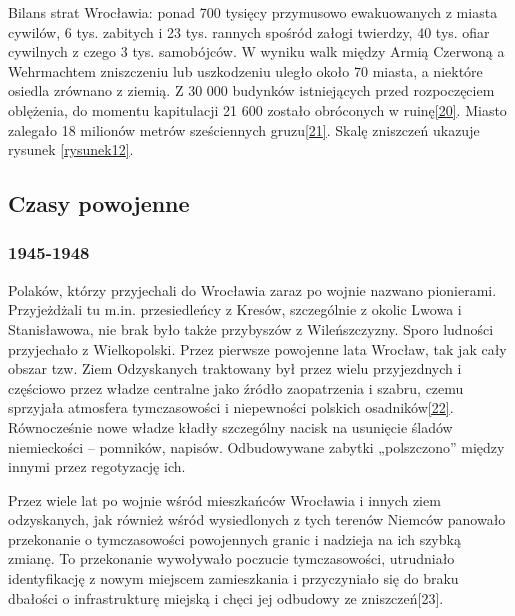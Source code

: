 \documentclass{article}
\begin{document}
\vspace{5pt}

\noindent Bilans strat Wrocławia: ponad 700 tysięcy przymusowo ewakuowanych z miasta cywilów, 6 tys. zabitych i 23 tys. rannych spośród załogi twierdzy, 40 tys. ofiar cywilnych z czego 3 tys. samobójców. W wyniku walk między Armią Czerwoną a Wehrmachtem zniszczeniu lub uszkodzeniu uległo około 70 miasta, a niektóre osiedla zrównano z ziemią. Z 30 000 budynków istniejących przed rozpoczęciem oblężenia, do momentu kapitulacji 21 600 zostało obróconych w ruinę\hyperref[20]{[20]}\label{220}. Miasto zalegało 18 milionów metrów sześciennych gruzu\hyperref[21]{[21]}\label{221}. Skalę zniszczeń ukazuje rysunek \ref{rysunek12}.

\vspace{6pt}

\subsection*{Czasy powojenne}

\subsubsection*{1945-1948}

Polaków, którzy przyjechali do Wrocławia zaraz po wojnie nazwano pionierami. Przyjeżdżali tu m.in. przesiedleńcy z Kresów, szczególnie z okolic Lwowa i Stanisławowa, nie brak było także przybyszów z Wileńszczyzny. Sporo ludności przyjechało z Wielkopolski. Przez pierwsze powojenne lata Wrocław, tak jak cały obszar tzw. Ziem Odzyskanych traktowany był przez wielu przyjezdnych i częściowo przez władze centralne jako źródło zaopatrzenia i szabru, czemu sprzyjała atmosfera tymczasowości i niepewności polskich osadników\hyperref[22]{[22]}\label{222}. Równocześnie nowe władze kładły szczególny nacisk na usunięcie śladów niemieckości – pomników, napisów. Odbudowywane zabytki „polszczono” między innymi przez regotyzację ich.

\vspace{6pt}

\noindent Przez wiele lat po wojnie wśród mieszkańców Wrocławia i innych ziem odzyskanych, jak również wśród wysiedlonych z tych terenów Niemców panowało przekonanie o tymczasowości powojennych granic i nadzieja na ich szybką zmianę. To przekonanie wywoływało poczucie tymczasowości, utrudniało identyfikację z nowym miejscem zamieszkania i przyczyniało się do braku dbałości o infrastrukturę miejską i chęci jej odbudowy ze zniszczeń[23].
\end{document}
